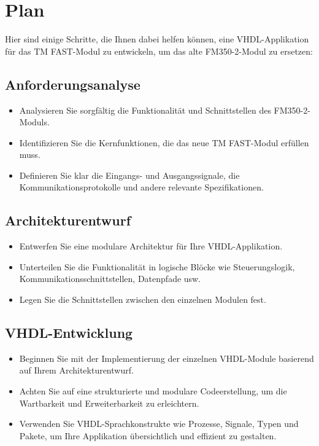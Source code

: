 \section{Plan} 

Hier sind einige Schritte, die Ihnen dabei helfen können, eine VHDL-Applikation für das TM FAST-Modul zu entwickeln, um das alte 
FM350-2-Modul zu ersetzen:

\subsection*{Anforderungsanalyse} 
\begin{itemize} 
    \item Analysieren Sie sorgfältig die Funktionalität und Schnittstellen des FM350-2-Moduls. 
    \item Identifizieren Sie die Kernfunktionen, die das neue TM FAST-Modul erfüllen muss. 
    \item Definieren Sie klar die Eingangs- und Ausgangssignale, die Kommunikationsprotokolle und andere relevante Spezifikationen. 
\end{itemize}

\subsection*{Architekturentwurf} 
\begin{itemize} 
    \item Entwerfen Sie eine modulare Architektur für Ihre VHDL-Applikation. 
    \item Unterteilen Sie die Funktionalität in logische Blöcke wie Steuerungslogik, Kommunikationsschnittstellen, Datenpfade usw. 
    \item Legen Sie die Schnittstellen zwischen den einzelnen Modulen fest. 
\end{itemize}

\subsection*{VHDL-Entwicklung} 
\begin{itemize} 
    \item Beginnen Sie mit der Implementierung der einzelnen VHDL-Module basierend auf Ihrem Architekturentwurf. 
    \item Achten Sie auf eine strukturierte und modulare Codeerstellung, um die Wartbarkeit und Erweiterbarkeit zu erleichtern. 
    \item Verwenden Sie VHDL-Sprachkonstrukte wie Prozesse, Signale, Typen und Pakete, um Ihre Applikation übersichtlich und 
    effizient zu gestalten. 
\end{itemize}

